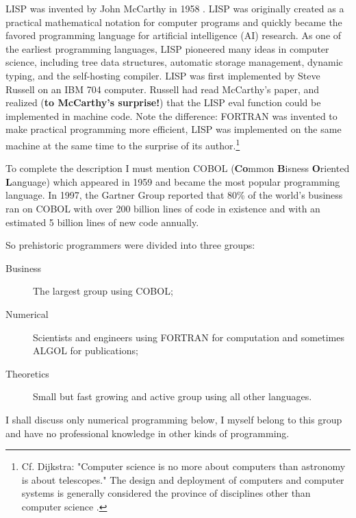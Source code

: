 \documentclass[a4paper]{article}
\begin{document}
LISP was invented by John McCarthy in 1958 \cite {wiki-lisp}. LISP was originally created as a practical mathematical notation for computer programs and quickly became the favored programming language for artificial intelligence (AI) research. As one of the earliest programming languages, LISP pioneered many ideas in computer science, including tree data structures, automatic storage management, dynamic typing, and the self-hosting compiler. LISP was first implemented by Steve Russell on an IBM 704 computer. Russell had read McCarthy's paper, and realized ({\bf to McCarthy's surprise!}) that the LISP eval function could be implemented in machine code. Note the difference: FORTRAN was invented to make practical programming more efficient, LISP was implemented on the same machine at the same time to the surprise of its author.\footnote {Cf. Dijkstra: "Computer science is no more about computers than astronomy is about telescopes." The design and deployment of computers and computer systems is generally considered the province of disciplines other than computer science \cite {wiki-cs}.}


To complete the description I must mention COBOL ({\bf Co}mmon {\bf B}isness {\bf O}riented {\bf L}anguage) \cite {wiki-cobol} which appeared in 1959 and became the most popular programming language. In 1997, the Gartner Group reported that 80\% of the world's business ran on COBOL with over 200 billion lines of code in existence and with an estimated 5 billion lines of new code annually.

So prehistoric programmers were divided into three groups:
\begin{description}
\item[Business] The largest group using COBOL;
\item[Numerical] Scientists and engineers using FORTRAN for computation and sometimes ALGOL  for publications;
\item[Theoretics] Small but fast growing and active group using all other languages.
\end{description}
I shall discuss only numerical programming below, I myself belong to this group and have no professional knowledge in other kinds of programming. 
\end{document}
